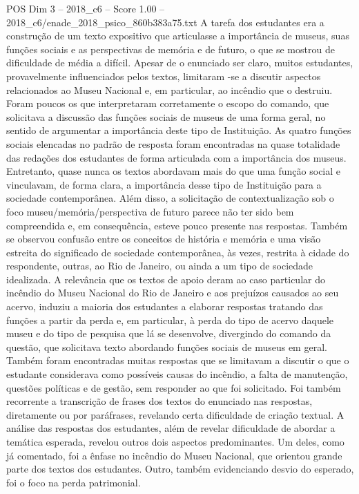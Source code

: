 \begin{textsample}{POS Dim 3 – 2018\_c6 – Score 1.00 – 2018\_c6/enade\_2018\_psico\_860b383a75.txt}
A tarefa dos estudantes era a construção de um texto expositivo que articulasse a importância de museus, suas funções sociais e as perspectivas de memória e de futuro, o que se mostrou de dificuldade de média a difícil.
Apesar de o enunciado ser claro, muitos estudantes, provavelmente influenciados pelos textos, limitaram -se a discutir aspectos relacionados ao Museu Nacional e, em particular, ao incêndio que o destruiu.
Foram poucos os que interpretaram corretamente o escopo do comando, que solicitava a discussão das funções sociais de museus de uma forma geral, no sentido de argumentar a importância deste tipo de Instituição.
As quatro funções sociais elencadas no padrão de resposta foram encontradas na quase totalidade das redações dos estudantes de forma articulada com a importância dos museus.
Entretanto, quase nunca os textos abordavam mais do que uma função social e vinculavam, de forma clara, a importância desse tipo de Instituição para a sociedade contemporânea.
Além disso, a solicitação de contextualização sob o foco museu/memória/perspectiva de futuro parece não ter sido bem compreendida e, em consequência, esteve pouco presente nas respostas.
Também se observou confusão entre os conceitos de história e memória e uma visão estreita do significado de sociedade contemporânea, às vezes, restrita à cidade do respondente, outras, ao Rio de Janeiro, ou ainda a um tipo de sociedade idealizada.
A relevância que os textos de apoio deram ao caso particular do incêndio do Museu Nacional do Rio de Janeiro e aos prejuízos causados ao seu acervo, induziu a maioria dos estudantes a elaborar respostas tratando das funções a partir da perda e, em particular, à perda do tipo de acervo daquele museu e do tipo de pesquisa que lá se desenvolve, divergindo do comando da questão, que solicitava texto abordando funções sociais de museus em geral.
Também foram encontradas muitas respostas que se limitavam a discutir o que o estudante considerava como possíveis causas do incêndio, a falta de manutenção, questões políticas e de gestão, sem responder ao que foi solicitado.
Foi também recorrente a transcrição de frases dos textos do enunciado nas respostas, diretamente ou por paráfrases, revelando certa dificuldade de criação textual.
A análise das respostas dos estudantes, além de revelar dificuldade de abordar a temática esperada, revelou outros dois aspectos predominantes.
Um deles, como já comentado, foi a ênfase no incêndio do Museu Nacional, que orientou grande parte dos textos dos estudantes.
Outro, também evidenciando desvio do esperado, foi o foco na perda patrimonial.

\end{textsample}
